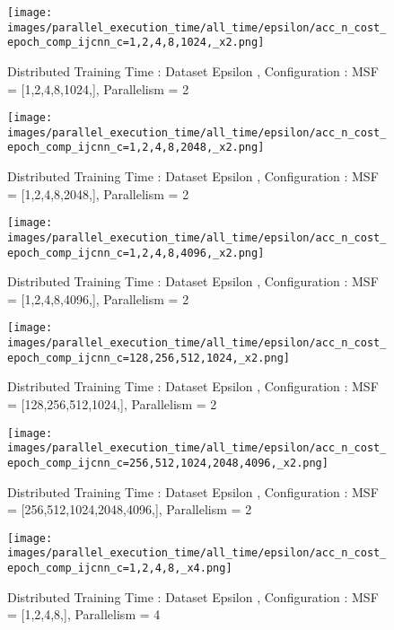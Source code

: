 \begin{figure*}[htbp]
\centering
\texttt{[image: images/parallel\_execution\_time/all\_time/epsilon/acc\_n\_cost\_epoch\_comp\_ijcnn\_c=1,2,4,8,1024,\_x2.png]}
\caption{Distributed Training Time : Dataset Epsilon , Configuration : MSF = [1,2,4,8,1024,], Parallelism = 2}
\label{fig:dis-msf-tr-time-epsilon-x2}
\end{figure*}


\begin{figure*}[htbp]
\centering
\texttt{[image: images/parallel\_execution\_time/all\_time/epsilon/acc\_n\_cost\_epoch\_comp\_ijcnn\_c=1,2,4,8,2048,\_x2.png]}
\caption{Distributed Training Time : Dataset Epsilon , Configuration : MSF = [1,2,4,8,2048,], Parallelism = 2}
\label{fig:dis-msf-tr-time-epsilon-x2}
\end{figure*}


\begin{figure*}[htbp]
\centering
\texttt{[image: images/parallel\_execution\_time/all\_time/epsilon/acc\_n\_cost\_epoch\_comp\_ijcnn\_c=1,2,4,8,4096,\_x2.png]}
\caption{Distributed Training Time : Dataset Epsilon , Configuration : MSF = [1,2,4,8,4096,], Parallelism = 2}
\label{fig:dis-msf-tr-time-epsilon-x2}
\end{figure*}


\begin{figure*}[htbp]
\centering
\texttt{[image: images/parallel\_execution\_time/all\_time/epsilon/acc\_n\_cost\_epoch\_comp\_ijcnn\_c=128,256,512,1024,\_x2.png]}
\caption{Distributed Training Time : Dataset Epsilon , Configuration : MSF = [128,256,512,1024,], Parallelism = 2}
\label{fig:dis-msf-tr-time-epsilon-x2}
\end{figure*}


\begin{figure*}[htbp]
\centering
\texttt{[image: images/parallel\_execution\_time/all\_time/epsilon/acc\_n\_cost\_epoch\_comp\_ijcnn\_c=256,512,1024,2048,4096,\_x2.png]}
\caption{Distributed Training Time : Dataset Epsilon , Configuration : MSF = [256,512,1024,2048,4096,], Parallelism = 2}
\label{fig:dis-msf-tr-time-epsilon-x2}
\end{figure*}


\begin{figure*}[htbp]
\centering
\texttt{[image: images/parallel\_execution\_time/all\_time/epsilon/acc\_n\_cost\_epoch\_comp\_ijcnn\_c=1,2,4,8,\_x4.png]}
\caption{Distributed Training Time : Dataset Epsilon , Configuration : MSF = [1,2,4,8,], Parallelism = 4}
\label{fig:dis-msf-tr-time-epsilon-x4}
\end{figure*}


